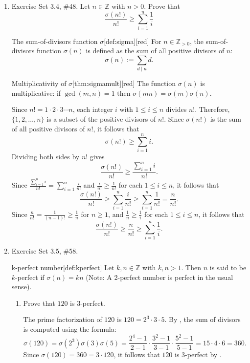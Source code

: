 \begin{enumerate}
  \item Exercise Set 3.4, \#48.
  Let $n \in \mathbb{Z}$ with $n>0$. Prove that
  $$
  \frac{\sigma(n!)}{n!} \geq \sum_{i=1}^n \frac{1}{i}
  $$
  \begin{define}{The sum-of-divisors function $\sigma$}[def:sigma][red]
  For $n\in\mathbb{Z}_{>0}$, the sum-of-divisors function $\sigma(n)$ is defined as the sum of all positive divisors of $n$:
  \[
  \sigma(n):=\sum_{d\mid n} d.
  \]
  \end{define}
  \begin{define}{Multiplicativity of $\sigma$}[thm:sigmamult][red]
  The function $\sigma(n)$ is multiplicative: if $\gcd(m,n)=1$ then $\sigma(mn)=\sigma(m)\sigma(n)$.
  \end{define}
  \begin{subprove}
    Since $n! = 1 \cdot 2 \cdot 3 \cdots n$, each integer $i$ with $1 \leq i \leq n$ divides $n!$.
    Therefore, $\{1, 2, \ldots, n\}$ is a subset of the positive divisors of $n!$.
    Since $\sigma(n!)$ is the sum of all positive divisors of $n!$, it follows that
    \[
    \sigma(n!) \geq \sum_{i=1}^n i.
    \]
    Dividing both sides by $n!$ gives
    \[
    \frac{\sigma(n!)}{n!} \geq \frac{\sum_{i=1}^n i}{n!}.
    \]
    Since $\frac{\sum_{i=1}^n i}{n!} = \sum_{i=1}^n \frac{i}{n!}$ and $\frac{i}{n!} \geq \frac{1}{n!}$ for each $1 \leq i \leq n$, it follows that
    \[
    \frac{\sigma(n!)}{n!} \geq \sum_{i=1}^n \frac{i}{n!} \geq \sum_{i=1}^n \frac{1}{n!} = \frac{n}{n!}.
    \]
    Since $\frac{n}{n!} = \frac{1}{(n-1)!} \geq \frac{1}{n}$ for $n \geq 1$, and $\frac{1}{n} \geq \frac{1}{i}$ for each $1 \leq i \leq n$, it follows that
    \[
    \frac{\sigma(n!)}{n!} \geq \frac{n}{n!} \geq \sum_{i=1}^n \frac{1}{i}.
    \]
  \end{subprove}


  \newpage

  \item Exercise Set 3.5, \#58.
  \begin{define}{k-perfect number}[def:kperfect]
  Let $k, n \in \mathbb{Z}$ with $k, n>1$. Then $n$ is said to be $k$-perfect if $\sigma(n)=k n$ (Note: A 2-perfect number is perfect in the usual sense).
  \end{define}
  \begin{enumerate}
    \item Prove that $120$ is $3$-perfect.
    \begin{subprove}
      The prime factorization of $120$ is $120 = 2^3 \cdot 3 \cdot 5$. By , the sum of divisors is computed using the formula:
      \[
      \sigma(120) = \sigma(2^3)\sigma(3)\sigma(5) = \frac{2^4-1}{2-1} \cdot \frac{3^2-1}{3-1} \cdot \frac{5^2-1}{5-1} = 15 \cdot 4 \cdot 6 = 360.
      \]
      Since $\sigma(120) = 360 = 3 \cdot 120$, it follows that $120$ is $3$-perfect by .
    \end{subprove}


\end{enumerate}
\end{enumerate}
